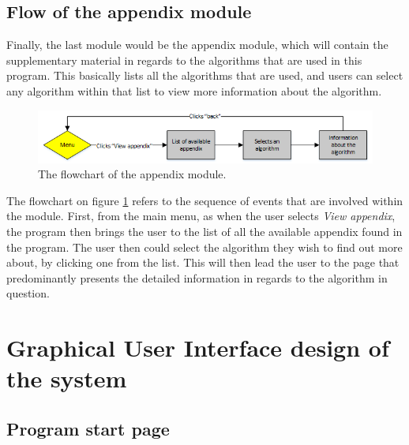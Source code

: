 \newpage

\subsection{Flow of the appendix module} \label{sec:flowchartAppendix}
Finally, the last module would be the appendix module, which will contain the supplementary material in regards to the algorithms that are used in this program. This basically lists all the algorithms that are used, and users can select any algorithm within that list to view more information about the algorithm.

\begin{figure}[H]
\centering
\includegraphics[scale=1]{images/report_images/flowchartAppendix.png}
\caption{The flowchart of the appendix module.}
\label{flowchartAppendix}
\end{figure}

The flowchart on figure \ref{flowchartAppendix} refers to the sequence of events that are involved within the module. First, from the main menu, as when the user selects \textit{View appendix}, the program then brings the user to the list of all the available appendix found in the program. The user then could select the algorithm they wish to find out more about, by clicking one from the list. This will then lead the user to the page that predominantly presents the detailed information in regards to the algorithm in question.

\newpage

\newpage
\section{Graphical User Interface design of the system} \label{uiDesign}
\subsection{Program start page}

